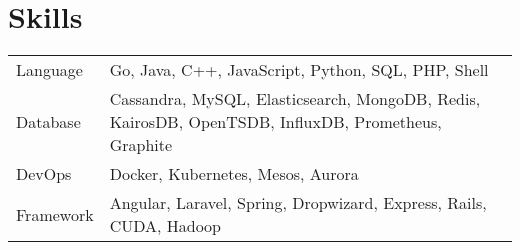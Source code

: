 \documentclass[11pt, letterpaper]{simple-cv}
\begin{document}
\section{Skills}
\begin{flushleft}
	\begin{tabular}{@{}ll@{}}
		Language  & Go, Java, C++, JavaScript, Python, SQL, PHP, Shell                                                  \\
		Database  & Cassandra, MySQL, Elasticsearch, MongoDB, Redis, KairosDB, OpenTSDB, InfluxDB, Prometheus, Graphite \\
		DevOps    & Docker, Kubernetes, Mesos, Aurora                                                                   \\
		Framework & Angular, Laravel, Spring, Dropwizard, Express, Rails, CUDA, Hadoop
	\end{tabular}
\end{flushleft}
\end{document}
